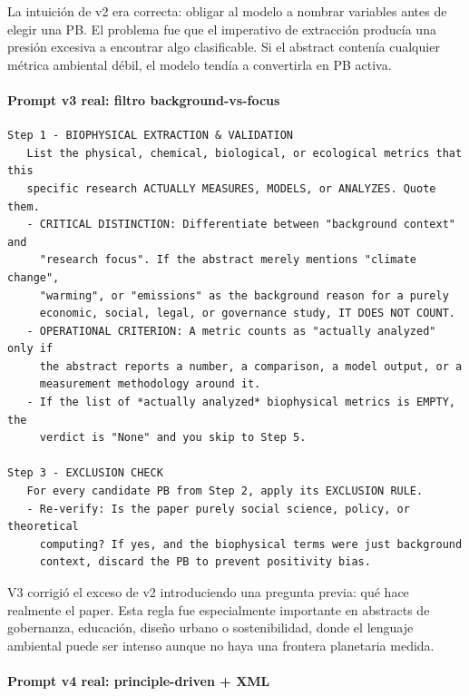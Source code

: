 La intuición de v2 era correcta: obligar al modelo a nombrar variables antes de elegir una PB. El problema fue que el imperativo de extracción producía una presión excesiva a encontrar algo clasificable. Si el abstract contenía cualquier métrica ambiental débil, el modelo tendía a convertirla en PB activa.

\paragraph{Prompt v3 real: filtro background-vs-focus}

{\footnotesize
\begin{verbatim}
Step 1 - BIOPHYSICAL EXTRACTION & VALIDATION
   List the physical, chemical, biological, or ecological metrics that this
   specific research ACTUALLY MEASURES, MODELS, or ANALYZES. Quote them.
   - CRITICAL DISTINCTION: Differentiate between "background context" and
     "research focus". If the abstract merely mentions "climate change",
     "warming", or "emissions" as the background reason for a purely
     economic, social, legal, or governance study, IT DOES NOT COUNT.
   - OPERATIONAL CRITERION: A metric counts as "actually analyzed" only if
     the abstract reports a number, a comparison, a model output, or a
     measurement methodology around it.
   - If the list of *actually analyzed* biophysical metrics is EMPTY, the
     verdict is "None" and you skip to Step 5.

Step 3 - EXCLUSION CHECK
   For every candidate PB from Step 2, apply its EXCLUSION RULE.
   - Re-verify: Is the paper purely social science, policy, or theoretical
     computing? If yes, and the biophysical terms were just background
     context, discard the PB to prevent positivity bias.
\end{verbatim}
}

V3 corrigió el exceso de v2 introduciendo una pregunta previa: qué hace realmente el paper. Esta regla fue especialmente importante en abstracts de gobernanza, educación, diseño urbano o sostenibilidad, donde el lenguaje ambiental puede ser intenso aunque no haya una frontera planetaria medida.

\paragraph{Prompt v4 real: principle-driven + XML}

